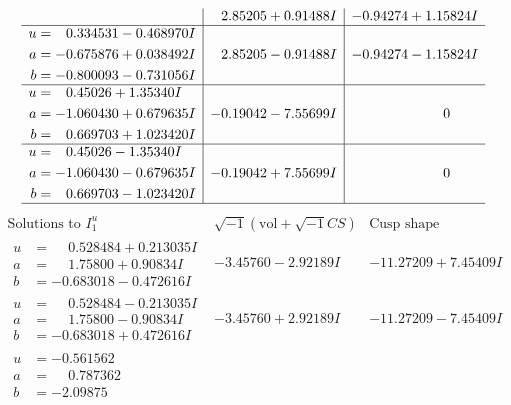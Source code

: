 \documentclass[1p]{elsarticle_modified}
\theoremstyle{definition}
\newcommand{\I}{\sqrt{-1}}
\begin{document}
$$\begin{array}{c|c|c}
 & \phantom{-}2.85205 + 0.91488 I & -0.94274 + 1.15824 I \\ \hline\begin{aligned}
u &= \phantom{-}0.334531 - 0.468970 I \\
a &= -0.675876 + 0.038492 I \\
b &= -0.800093 - 0.731056 I\end{aligned}
 & \phantom{-}2.85205 - 0.91488 I & -0.94274 - 1.15824 I \\ \hline\begin{aligned}
u &= \phantom{-}0.45026 + 1.35340 I \\
a &= -1.060430 + 0.679635 I \\
b &= \phantom{-}0.669703 + 1.023420 I\end{aligned}
 & -0.19042 - 7.55699 I & \phantom{-0.000000 } 0 \\ \hline\begin{aligned}
u &= \phantom{-}0.45026 - 1.35340 I \\
a &= -1.060430 - 0.679635 I \\
b &= \phantom{-}0.669703 - 1.023420 I\end{aligned}
 & -0.19042 + 7.55699 I & \phantom{-0.000000 } 0\\
 \hline 
 \end{array}$$\newpage$$\begin{array}{c|c|c}  
\text{Solutions to }I^u_{1}& \I (\text{vol} + \sqrt{-1}CS) & \text{Cusp shape}\\
 \hline 
\begin{aligned}
u &= \phantom{-}0.528484 + 0.213035 I \\
a &= \phantom{-}1.75800 + 0.90834 I \\
b &= -0.683018 - 0.472616 I\end{aligned}
 & -3.45760 - 2.92189 I & -11.27209 + 7.45409 I \\ \hline\begin{aligned}
u &= \phantom{-}0.528484 - 0.213035 I \\
a &= \phantom{-}1.75800 - 0.90834 I \\
b &= -0.683018 + 0.472616 I\end{aligned}
 & -3.45760 + 2.92189 I & -11.27209 - 7.45409 I \\ \hline\begin{aligned}
u &= -0.561562\phantom{ +0.000000I} \\
a &= \phantom{-}0.787362\phantom{ +0.000000I} \\
b &= -2.09875\phantom{ +0.000000I}\end{aligned}

\end{array}$$
\end{document}
